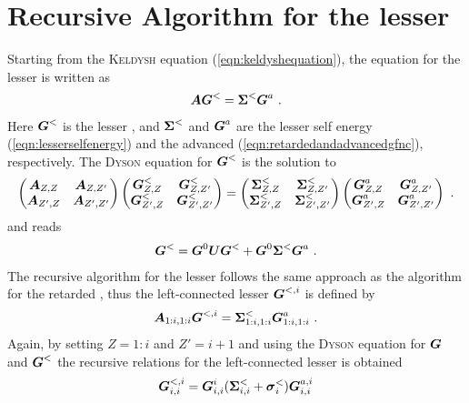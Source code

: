 \section{Recursive Algorithm for the lesser \gfnc{}}
Starting from the \textsc{Keldysh} equation (\cref{eqn:keldyshequation}), the equation for the lesser \gfnc{} is written as
\begin{align}
\boldsymbol{A}\boldsymbol{G}^< = \boldsymbol{\Sigma}^< \boldsymbol{G}^a\ .
\end{align}
Here $\boldsymbol{G}^<$ is the lesser \gfnc{}, and $\boldsymbol{\Sigma}^<$ and $\boldsymbol{G}^a$ are the lesser self energy (\cref{eqn:lesserselfenergy}) and the advanced \gfnc{} (\cref{eqn:retardedandadvancedgfnc}), respectively. The \textsc{Dyson} equation for $\boldsymbol{G}^<$ is the solution to
\begin{align}
  \begin{pmatrix} \boldsymbol{A}_{Z,Z} & \boldsymbol{A}_{Z,Z'}\\
		  \boldsymbol{A}_{Z',Z} & \boldsymbol{A}_{Z',Z'}
  \end{pmatrix}
  \begin{pmatrix} \boldsymbol{G}^<_{Z,Z} & \boldsymbol{G}^<_{Z,Z'}\\
		  \boldsymbol{G}^<_{Z',Z} & \boldsymbol{G}^<_{Z',Z'}
  \end{pmatrix} = 
  \begin{pmatrix} \boldsymbol{\Sigma}^<_{Z,Z} & \boldsymbol{\Sigma}^<_{Z,Z'}\\
		  \boldsymbol{\Sigma}^<_{Z',Z} & \boldsymbol{\Sigma}^<_{Z',Z'}
  \end{pmatrix}
  \begin{pmatrix} \boldsymbol{G}^a_{Z,Z} & \boldsymbol{G}^a_{Z,Z'}\\
		  \boldsymbol{G}^a_{Z',Z} & \boldsymbol{G}^a_{Z',Z'}
  \end{pmatrix}\ .
\end{align}
and reads
\begin{align}
\boldsymbol{G}^< = \boldsymbol{G}^0\boldsymbol{U}\boldsymbol{G}^< + \boldsymbol{G}^0\boldsymbol{\Sigma}^<\boldsymbol{G}^a\ .
\end{align}
The recursive algorithm for the lesser \gfnc{} follows the same approach as the algorithm for the retarded \gfnc{}, thus the left-connected lesser \gfnc{} $\boldsymbol{G}^{<,i}$ is defined by
\begin{align}
\mat{A}_{1:i,1:i}\mat{G}^{<,i}=\mat{\Sigma}^<_{1:i,1:i}\mat{G}^a_{1:i,1:i}\ .
\end{align}
Again, by setting $Z=1:i$ and $Z'=i+1$ and using the \textsc{Dyson} equation for $\boldsymbol{G}$ and $\boldsymbol{G}^<$ the recursive relations for the left-connected lesser \gfnc{} is obtained
\begin{align}
\boldsymbol{G}^{<,i}_{i,i} = \boldsymbol{G}^{i}_{i,i}( \boldsymbol{\Sigma}^<_{i,i}+\boldsymbol{\sigma}^<_{i})\boldsymbol{G}^{a,i}_{i,i}
\end{align}
